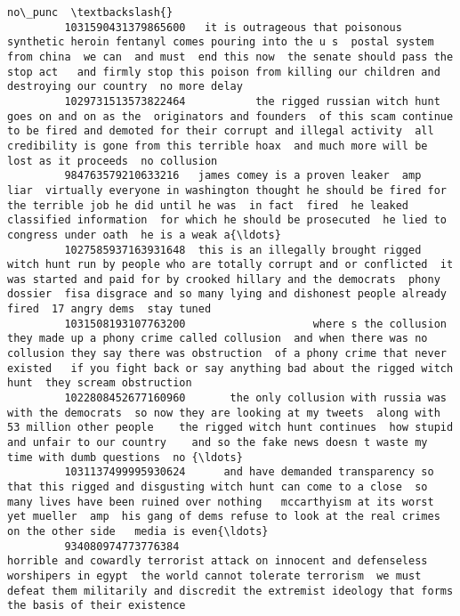 \documentclass[11pt]{article}
\begin{document}
\begin{Verbatim}[commandchars=\\\{\}]
                                                                                                                                                                                                                                                                                                              no\_punc  \textbackslash{}
         1031590431379865600   it is outrageous that poisonous synthetic heroin fentanyl comes pouring into the u s  postal system from china  we can  and must  end this now  the senate should pass the stop act   and firmly stop this poison from killing our children and destroying our country  no more delay    
         1029731513573822464           the rigged russian witch hunt goes on and on as the  originators and founders  of this scam continue to be fired and demoted for their corrupt and illegal activity  all credibility is gone from this terrible hoax  and much more will be lost as it proceeds  no collusion    
         984763579210633216   james comey is a proven leaker  amp  liar  virtually everyone in washington thought he should be fired for the terrible job he did until he was  in fact  fired  he leaked classified information  for which he should be prosecuted  he lied to congress under oath  he is a weak a{\ldots}   
         1027585937163931648  this is an illegally brought rigged witch hunt run by people who are totally corrupt and or conflicted  it was started and paid for by crooked hillary and the democrats  phony dossier  fisa disgrace and so many lying and dishonest people already fired  17 angry dems  stay tuned    
         1031508193107763200                    where s the collusion  they made up a phony crime called collusion  and when there was no collusion they say there was obstruction  of a phony crime that never existed   if you fight back or say anything bad about the rigged witch hunt  they scream obstruction    
         1022808452677160960       the only collusion with russia was with the democrats  so now they are looking at my tweets  along with 53 million other people    the rigged witch hunt continues  how stupid and unfair to our country    and so the fake news doesn t waste my time with dumb questions  no {\ldots}   
         1031137499995930624      and have demanded transparency so that this rigged and disgusting witch hunt can come to a close  so many lives have been ruined over nothing   mccarthyism at its worst  yet mueller  amp  his gang of dems refuse to look at the real crimes on the other side   media is even{\ldots}   
         934080974773776384                                                 horrible and cowardly terrorist attack on innocent and defenseless worshipers in egypt  the world cannot tolerate terrorism  we must defeat them militarily and discredit the extremist ideology that forms the basis of their existence    

\end{Verbatim}
\end{document}
